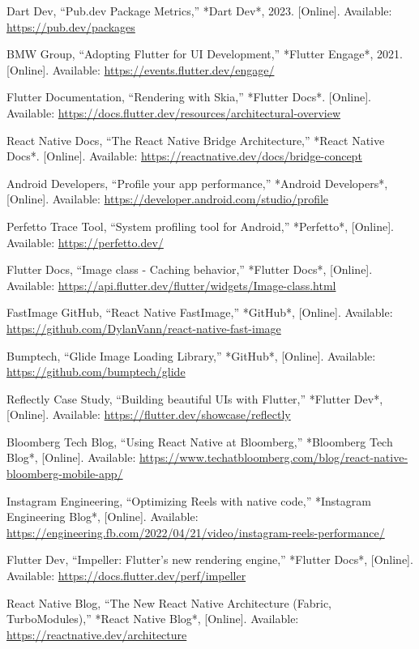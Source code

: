 \documentclass[12pt]{report}
\begin{document}
\begin{thebibliography}{1}
Dart Dev, “Pub.dev Package Metrics,” *Dart Dev*, 2023. [Online]. Available: \url{https://pub.dev/packages}

BMW Group, “Adopting Flutter for UI Development,” *Flutter Engage*, 2021. [Online]. Available: \url{https://events.flutter.dev/engage/}

Flutter Documentation, “Rendering with Skia,” *Flutter Docs*. [Online]. Available: \url{https://docs.flutter.dev/resources/architectural-overview}

React Native Docs, “The React Native Bridge Architecture,” *React Native Docs*. [Online]. Available: \url{https://reactnative.dev/docs/bridge-concept}

Android Developers, “Profile your app performance,” *Android Developers*, [Online]. Available: \url{https://developer.android.com/studio/profile}

Perfetto Trace Tool, “System profiling tool for Android,” *Perfetto*, [Online]. Available: \url{https://perfetto.dev/}

Flutter Docs, “Image class - Caching behavior,” *Flutter Docs*, [Online]. Available: \url{https://api.flutter.dev/flutter/widgets/Image-class.html}

FastImage GitHub, “React Native FastImage,” *GitHub*, [Online]. Available: \url{https://github.com/DylanVann/react-native-fast-image}

Bumptech, “Glide Image Loading Library,” *GitHub*, [Online]. Available: \url{https://github.com/bumptech/glide}

Reflectly Case Study, “Building beautiful UIs with Flutter,” *Flutter Dev*, [Online]. Available: \url{https://flutter.dev/showcase/reflectly}

Bloomberg Tech Blog, “Using React Native at Bloomberg,” *Bloomberg Tech Blog*, [Online]. Available: \url{https://www.techatbloomberg.com/blog/react-native-bloomberg-mobile-app/}

Instagram Engineering, “Optimizing Reels with native code,” *Instagram Engineering Blog*, [Online]. Available: \url{https://engineering.fb.com/2022/04/21/video/instagram-reels-performance/}

Flutter Dev, “Impeller: Flutter’s new rendering engine,” *Flutter Docs*, [Online]. Available: \url{https://docs.flutter.dev/perf/impeller}

React Native Blog, “The New React Native Architecture (Fabric, TurboModules),” *React Native Blog*, [Online]. Available: \url{https://reactnative.dev/architecture}

\end{thebibliography}
\end{document}
